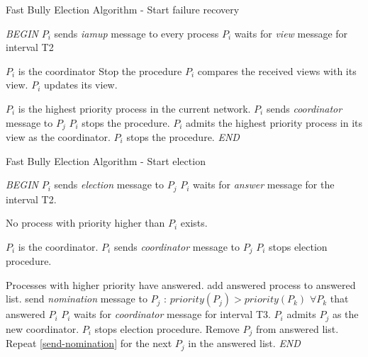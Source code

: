 \documentclass[dareport.tex]{subfiles}
\begin{document}
\begin{algorithm}[h]
	\caption{Fast Bully Election Algorithm - Start failure recovery}
	\label{fast-bully-algorithm-start-failure-recovery}
	\begin{algorithmic}[1]
		\BState \emph{BEGIN}
		\State $P_{i}$ sends \emph{iamup} message to every process
		\State $P_{i}$ waits for \emph{view} message for interval T2
		
		\Comment $P_{i}$ is the coordinator
		\State Stop the procedure
		\Else
		\State $P_{i}$ compares the received views with its view.
			\State $P_{i}$ updates its view.
		\EndIf
		
		\Comment $P_{i}$ is the highest priority process in the current network.
				\State $P_{i}$ sends \emph{coordinator} message to $P_{j}$
				\State $P_{i}$ stops the procedure.
			\EndFor
		\Else
			\State $P_{i}$ admits the highest priority process in its view as the coordinator.
			\State $P_{i}$ stops the procedure.
		\EndIf
		\EndIf
		\EndProcedure
		\BState \emph{END}
	\end{algorithmic}
\end{algorithm}
\begin{algorithm}[H]
	\caption{Fast Bully Election Algorithm -  Start election}
	\label{fast-bully-algorithm-start-election}
	\begin{algorithmic}[1]
		\BState \emph{BEGIN}
				\State $P_{i}$ sends \emph{election} message to $P_{j}$
			\EndFor
			\State $P_{i}$ waits for \emph{answer} message for the interval T2.
				
			\Comment No process with priority higher than $P_{i}$ exists.
				
			\Comment $P_{i}$ is the coordinator.
					\State $P_{i}$ sends \emph{coordinator} message to $P_{j}$
				\EndFor
				\State $P_{i}$ stops election procedure.
			\Else
			
			\Comment Processes with higher priority have answered.
				\State add answered process to answered list.
				\State send \emph{nomination} message to $P_{j}$ : $priority(P_{j}) > priority(P_{k})$ $\forall P_{k}$ that answered  $P_{i}$ \label{send-nomination}
				\State $P_{i}$ waits for \emph{coordinator} message for interval T3.
					\State $P_{i}$ admits $P_{j}$ as the new coordinator.
					\State $P_{i}$ stops election procedure.
				\Else
					\State Remove $P_{j}$ from answered list.
					\State Repeat \cref{send-nomination} for the next $P_{j}$ in the answered list.
						\State {}
					\EndIf
				\EndIf
			\EndIf
		\EndProcedure
		\BState \emph{END}
	\end{algorithmic}
\end{algorithm}
\end{document}
